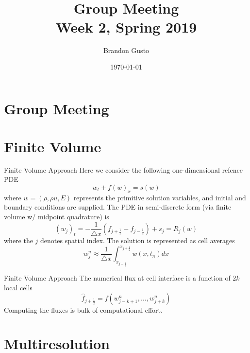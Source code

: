 \documentclass{beamer}
\begin{document}
\section{Group Meeting}
\title{Group Meeting \\ Week 2, Spring 2019}
\author{Brandon Gusto} %
\date{\today}
\frame{\titlepage}

\section{Finite Volume}

\begin{frame}[shrink=10]{Finite Volume Approach}
	Here we consider the following one-dimensional refence PDE
	\begin{equation*}
		w_{t} + f(w)_{x} = s(w)
	\end{equation*}
	where $w = (\rho,\rho u,E)$ represents the primitive solution variables, and initial and boundary
	conditions are supplied. The PDE in semi-discrete form (via finite volume w/ midpoint quadrature) is
	\begin{equation*}
        (w_{j})_{t} = -\frac{1}{\triangle x} \left( f_{j+\frac{1}{2}} - f_{j-\frac{1}{2}} \right) + s_{j} = R_{j}(w)
	\end{equation*}
	where the $j$ denotes spatial index. The solution is represented as cell averages
	\begin{equation*}
        w^{n}_{j} \approx \frac{1}{\triangle x} \int_{x_{j-\frac{1}{2}}}^{x_{j+\frac{1}{2}}} w(x,t_{n}) dx
	\end{equation*}
\end{frame}


\begin{frame}[shrink=10]{Finite Volume Approach}
	 The numerical flux at cell interface is a function of $2k$ local cells
	\begin{equation*}
        \hat{f}_{j+\frac{1}{2}} = f(w^{n}_{j-k+1},\dots,w^{n}_{j+k})
	\end{equation*}
	Computing the fluxes is bulk of computational effort.

\end{frame}


\section{Multiresolution}
\end{document}
